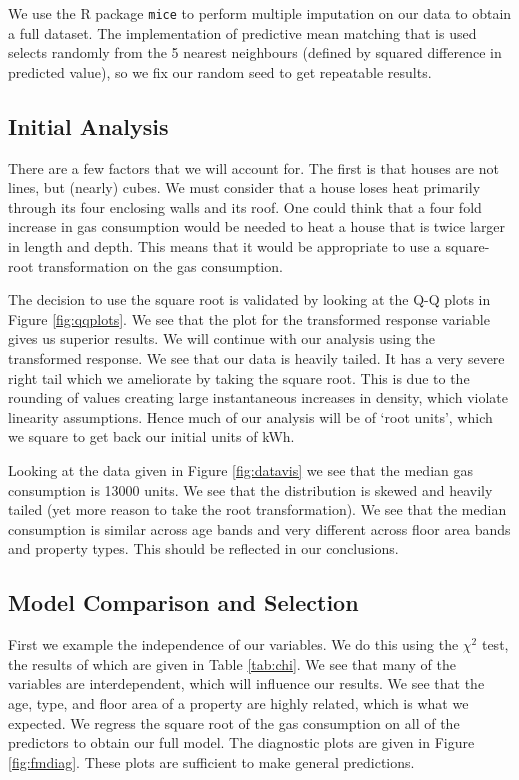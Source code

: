 \documentclass[]{extarticle}
\begin{document}
We use the R package \texttt{mice} to perform multiple imputation on our data to obtain a full dataset. The implementation of predictive mean matching that is used selects randomly from the 5 nearest neighbours (defined by squared difference in predicted value), so we fix our random seed to get repeatable results.

\subsection{Initial Analysis}

There are a few factors that we will account for. The first is that houses are not lines, but (nearly) cubes. We must consider that a house loses heat primarily through its four enclosing walls and its roof. One could think that a four fold increase in gas consumption would be needed to heat a house that is twice larger in length and depth. This means that it would be appropriate to use a square-root transformation on the gas consumption. 

The decision to use the square root is validated by looking at the Q-Q plots in Figure \ref{fig:qqplots}. We see that the plot for the transformed response variable gives us superior results. We will continue with our analysis using the transformed response. We see that our data is heavily tailed. It has a very severe right tail which we ameliorate by taking the square root. This is due to the rounding of values creating large instantaneous increases in density, which violate linearity assumptions. Hence much of our analysis will be of `root units', which we square to get back our initial units of kWh.

Looking at the data given in Figure \ref{fig:datavis} we see that the median gas consumption is 13000 units. We see that the distribution is skewed and heavily tailed (yet more reason to take the root transformation). We see that the median consumption is similar across age bands and very different across floor area bands and property types. This should be reflected in our conclusions. 

\subsection{Model Comparison and Selection}
 First we example the independence of our variables. We do this using the $\chi^2$ test, the results of which are given in Table \ref{tab:chi}. We see that many of the variables are interdependent, which will influence our results. We see that the age, type, and floor area of a property are highly related, which is what we expected. We regress the square root of the gas consumption on all of the predictors to obtain our full model. The diagnostic plots are given in Figure \ref{fig:fmdiag}. These plots are sufficient to make general predictions.
\end{document}
